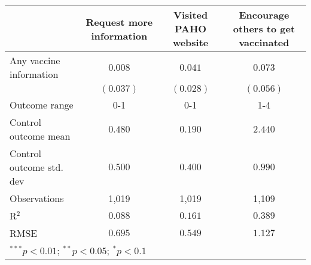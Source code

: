\begin{table}
\begin{center}
\begin{tabular}{l c c c}
\hline
 & Request more information & Visited PAHO website & Encourage others to get vaccinated \\
\hline
Any vaccine information  & $0.008$   & $0.041$   & $0.073$   \\
                         & $(0.037)$ & $(0.028)$ & $(0.056)$ \\
\hline
Outcome range            & 0-1       & 0-1       & 1-4       \\
Control outcome mean     & $0.480$   & $0.190$   & $2.440$   \\
Control outcome std. dev & $0.500$   & $0.400$   & $0.990$   \\
Observations             & 1,019     & 1,019     & 1,109     \\
R$^{2}$                  & $0.088$   & $0.161$   & $0.389$   \\
RMSE                     & $0.695$   & $0.549$   & $1.127$   \\
\hline
\multicolumn{4}{l}{\scriptsize{$^{***}p<0.01$; $^{**}p<0.05$; $^{*}p<0.1$}}
\end{tabular}
\caption{}
\label{table:Tables and Figures/SI_table21_anyinfo_Argentina_behav}
\end{center}
\end{table}
